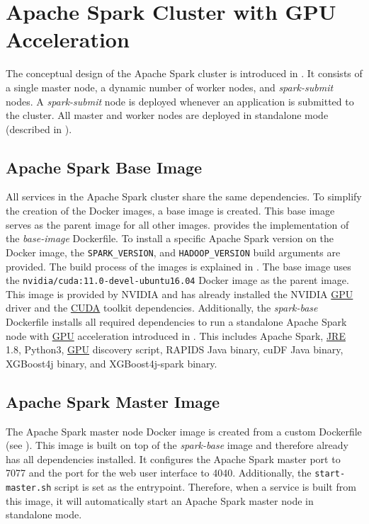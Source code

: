 \section{Apache Spark Cluster with GPU Acceleration}
\label{sec:07_spark}
The conceptual design of the Apache Spark cluster is introduced in . It consists of a single master node, a dynamic number of worker nodes, and \textit{spark-submit} nodes. A \textit{spark-submit} node is deployed whenever an application is submitted to the cluster.
All master and worker nodes are deployed in standalone mode (described in ).


\subsection{Apache Spark Base Image}
All services in the Apache Spark cluster share the same dependencies. To simplify the creation of the Docker images, a base image is created. This base image serves as the parent image for all other images.
%
 provides the implementation of the \textit{base-image} Dockerfile.
%
To install a specific Apache Spark version on the Docker image, the \texttt{SPARK\_VERSION}, and \texttt{HADOOP\_VERSION} build arguments are provided. The build process of the images is explained in .
%
The base image uses the \texttt{nvidia/cuda:11.0-devel-ubuntu16.04} Docker image as the parent image. This image is provided by NVIDIA and has already installed the NVIDIA \hyperlink{abbr:gpu}{GPU} driver and the \hyperlink{abbr:cuda}{CUDA} toolkit dependencies.
%
Additionally, the \textit{spark-base} Dockerfile installs all required dependencies to run a standalone Apache Spark node with \hyperlink{abbr:gpu}{GPU} acceleration introduced in . This includes Apache Spark, \hyperlink{abbr:jre}{JRE} 1.8, Python3, \hyperlink{abbr:gpu}{GPU} discovery script, RAPIDS Java binary, cuDF Java binary, XGBoost4j binary, and XGBoost4j-spark binary.


\subsection{Apache Spark Master Image}
The Apache Spark master node Docker image is created from a custom Dockerfile (see ).
This image is built on top of the \textit{spark-base} image and therefore already has all dependencies installed.
It configures the Apache Spark master port to 7077 and the port for the web user interface to 4040.
Additionally, the \texttt{start-master.sh} script is set as the entrypoint. Therefore, when a service is built from this image, it will automatically start an Apache Spark master node in standalone mode.


